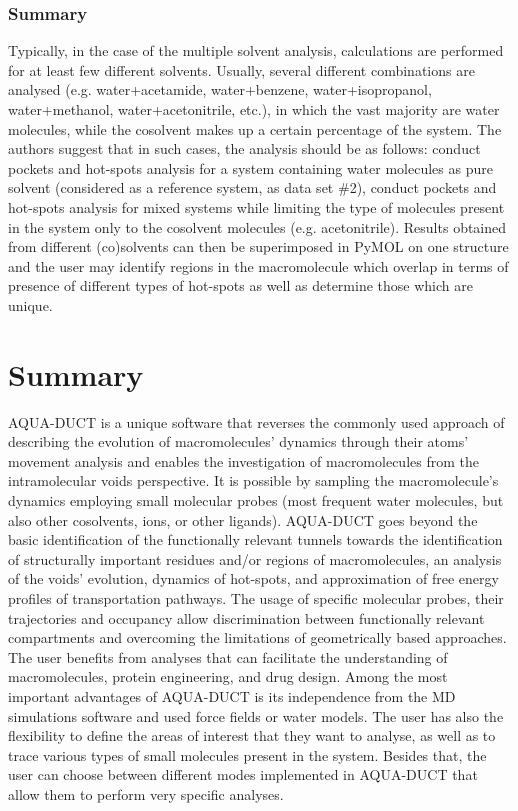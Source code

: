 \documentclass[9pt,tutorial]{livecoms}
\begin{document}
\subsubsection{Summary}
Typically, in the case of the multiple solvent analysis, calculations are performed for at least few different solvents. Usually, several different combinations are analysed (e.g. water+acetamide, water+benzene, water+isopropanol, water+methanol, water+acetonitrile, etc.), in which the vast majority are water molecules, while the cosolvent makes up a certain percentage of the system. The authors suggest that in such cases, the analysis should be as follows: conduct pockets and hot-spots analysis for a system containing water molecules as pure solvent (considered as a reference system, as data set \#2), conduct pockets and hot-spots analysis for mixed systems while limiting the type of molecules present in the system only to the cosolvent molecules (e.g. acetonitrile). Results obtained from different (co)solvents can then be superimposed in PyMOL on one structure and the user may identify regions in the macromolecule which overlap in terms of presence of different types of hot-spots as well as determine those which are unique.     

\section{Summary}
AQUA-DUCT is a unique software that reverses the commonly used approach of describing the evolution of macromolecules’ dynamics through their atoms’ movement analysis and enables the investigation of macromolecules from the intramolecular voids perspective. It is possible by sampling the macromolecule's dynamics employing small molecular probes (most frequent water molecules, but also other cosolvents, ions, or other ligands). AQUA-DUCT goes beyond the basic identification of the functionally relevant tunnels towards the identification of structurally important residues and/or regions of macromolecules, an analysis of the voids’ evolution, dynamics of hot-spots, and approximation of free energy profiles of transportation pathways. The usage of specific molecular probes, their trajectories and occupancy allow discrimination between functionally relevant compartments and overcoming the limitations of geometrically based approaches. The user benefits from analyses that can facilitate the understanding of macromolecules, protein engineering, and drug design. Among the most important advantages of AQUA-DUCT is its independence from the MD simulations software and used force fields or water models. The user has also the flexibility to define the areas of interest that they want to analyse, as well as to trace various types of small molecules present in the system. Besides that, the user can choose between different modes implemented in AQUA-DUCT that allow them to perform very specific analyses. 
\end{document}
